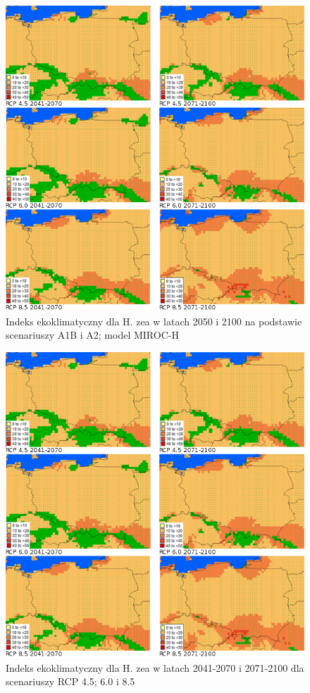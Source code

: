 \documentclass[polish,a4paper]{article}
\begin{document}
\begin{figure}[H]
\includegraphics[width=1\linewidth]{heliothis_projekcje2} \caption{Indeks ekoklimatyczny dla H. zea w latach 2050 i 2100 na podstawie scenariuszy A1B i A2; model MIROC-H}\label{fig:heliothisp1}
\end{figure}

\begin{figure}
\includegraphics[width=1\linewidth]{heliothis_projekcje2} \caption{Indeks ekoklimatyczny dla H. zea w latach 2041-2070 i 2071-2100 dla scenariuszy RCP 4.5; 6.0 i 8.5}\label{fig:heliothisp2}
\end{figure}
\end{document}
